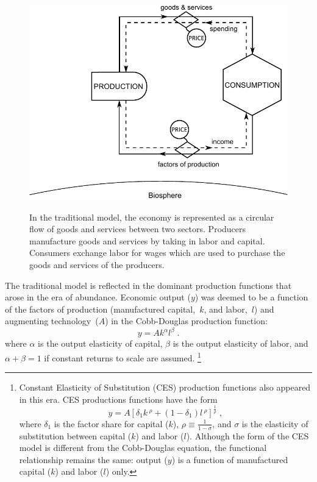 \begin{figure}[!ht]
\centering\
\includegraphics[width=\linewidth]{Part_0/Chapter_Introduction/images/Perpetual_motion_1.pdf}
\caption[The traditional model]{In the traditional model, the economy 
is represented as a circular flow of goods and services between two sectors. 
Producers manufacture goods and services 
by taking in labor and capital. 
Consumers exchange labor for wages 
which are used to purchase 
the goods and services of the producers.}
\label{fig:perp_motion_1}
\end{figure}

The traditional model is reflected in the dominant production functions
that arose in the era of abundance. 
Economic output ($y$) was deemed to be a function 
of the factors of production (manufactured capital,~$k$, and labor,~$l$)
and augmenting technology~($A$) in the Cobb-Douglas production function:
%
\begin{equation} \label{eq:cobb-douglas}
	y = A k^{\alpha} l^\beta \; .
\end{equation}	 
%
where $\alpha$ is the output elasticity of capital, $\beta$ is the output elasticity
of labor, and $\alpha + \beta = 1$ if constant returns to scale are assumed.%
	\footnote{
	Constant Elasticity of Substitution (CES) production functions also appeared 
	in this era.
	CES productions functions have the form
	\begin{equation*}
		y = A \left[ \delta_1 k \, ^\rho + (1-\delta_1) l \, ^\rho    \right]^{\frac{1}{\rho}} \; ,
	\end{equation*}
	where $\delta_1$ is the factor share for capital ($k$),
	$\rho \equiv \frac{1}{1-\sigma}$, and 
	$\sigma$ is the elasticity of substitution 
	between capital ($k$) and labor ($l$).\cite{Solow:1956wj}
	Although the form of the CES model is different from 
	the Cobb-Douglas equation, 
	the functional relationship remains the same: 
	output ($y$) is a function of manufactured capital ($k$) and labor ($l$) only.
	}

